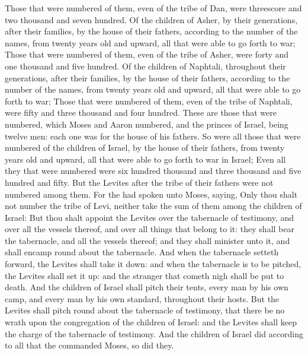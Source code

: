 \begin{biblechapter}
\verse Those that were numbered of them, even of the tribe of Dan, were threescore and two thousand and seven hundred.
\verse Of the children of Asher, by their generations, after their families, by the house of their fathers, according to the number of the names, from twenty years old and upward, all that were able to go forth to war;
\verse Those that were numbered of them, even of the tribe of Asher, were forty and one thousand and five hundred.
\verse Of the children of Naphtali, throughout their generations, after their families, by the house of their fathers, according to the number of the names, from twenty years old and upward, all that were able to go forth to war;
\verse Those that were numbered of them, even of the tribe of Naphtali, were fifty and three thousand and four hundred.
\verse These are those that were numbered, which Moses and Aaron numbered, and the princes of Israel, being twelve men: each one was for the house of his fathers.
\verse So were all those that were numbered of the children of Israel, by the house of their fathers, from twenty years old and upward, all that were able to go forth to war in Israel;
\verse Even all they that were numbered were six hundred thousand and three thousand and five hundred and fifty.
\verse But the Levites after the tribe of their fathers were not numbered among them.
\verse For the \LORD had spoken unto Moses, saying,
\verse Only thou shalt not number the tribe of Levi, neither take the sum of them among the children of Israel:
\verse But thou shalt appoint the Levites over the tabernacle of testimony, and over all the vessels thereof, and over all things that belong to it: they shall bear the tabernacle, and all the vessels thereof; and they shall minister unto it, and shall encamp round about the tabernacle.
\verse And when the tabernacle setteth forward, the Levites shall take it down: and when the tabernacle is to be pitched, the Levites shall set it up: and the stranger that cometh nigh shall be put to death.
\verse And the children of Israel shall pitch their tents, every man by his own camp, and every man by his own standard, throughout their hosts.
\verse But the Levites shall pitch round about the tabernacle of testimony, that there be no wrath upon the congregation of the children of Israel: and the Levites shall keep the charge of the tabernacle of testimony.
\verse And the children of Israel did according to all that the \LORD commanded Moses, so did they.
\end{biblechapter}

